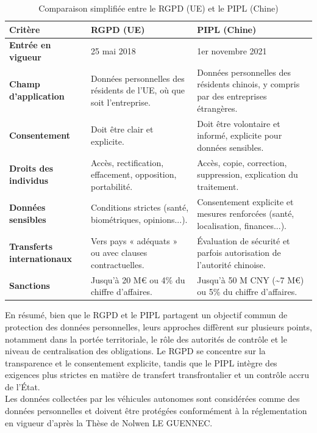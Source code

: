 
\begin{table}[H]
\centering
\caption{Comparaison simplifiée entre le RGPD (UE) et le PIPL (Chine)}
\begin{tabular}{|p{4cm}|p{5cm}|p{5cm}|}
\hline
\textbf{Critère} & \textbf{RGPD (UE)} & \textbf{PIPL (Chine)} \\ \hline
\textbf{Entrée en vigueur} & 25 mai 2018 & 1er novembre 2021 \\ \hline
\textbf{Champ d’application} & Données personnelles des résidents de l’UE, où que soit l’entreprise. & Données personnelles des résidents chinois, y compris par des entreprises étrangères. \\ \hline
\textbf{Consentement} & Doit être clair et explicite. & Doit être volontaire et informé, explicite pour données sensibles. \\ \hline
\textbf{Droits des individus} & Accès, rectification, effacement, opposition, portabilité. & Accès, copie, correction, suppression, explication du traitement. \\ \hline
\textbf{Données sensibles} & Conditions strictes (santé, biométriques, opinions...). & Consentement explicite et mesures renforcées (santé, localisation, finances...). \\ \hline
\textbf{Transferts internationaux} & Vers pays « adéquats » ou avec clauses contractuelles. & Évaluation de sécurité et parfois autorisation de l’autorité chinoise. \\ \hline
\textbf{Sanctions} & Jusqu’à 20 M€ ou 4\% du chiffre d'affaires. & Jusqu’à 50 M CNY (\textasciitilde 7 M€) ou 5\% du chiffre d'affaires. \\ \hline
\end{tabular}
\end{table}
En résumé, bien que le RGPD et le PIPL partagent un objectif commun de protection des données personnelles, leurs approches diffèrent sur plusieurs points, notamment dans la portée territoriale, le rôle des autorités de contrôle et le niveau de centralisation des obligations. Le RGPD se concentre sur la transparence et le consentement explicite, 
tandis que le PIPL intègre des exigences plus strictes en matière de transfert transfrontalier et un contrôle accru de l’État.\\
Les données collectées par les véhicules autonomes sont considérées comme des données personnelles et doivent être protégées conformément à la réglementation en vigueur d'après la Thèse de Nolwen LE GUENNEC\cite{le_gennec_machine_2023}.\\
